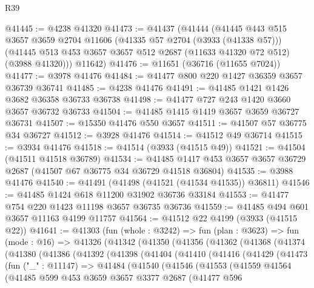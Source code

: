 \begin{lexlean}{R39}
\begin{coremodule}
@41445 := @4238 @41320
@41473 := @41437
    (@41444
      (@41445
        @443
        @515
        @3657
        @3659
        @2704
        @11606
        (@41335 @57 @2704 (@3933 (@41338 @57)))
        (@41445 @513 @453 @3657 @3657 @512 @2687 (@11633 @41320 @72 @512) (@3988 @41320)))
      @11642)
@41476 := @11651 (@36716 (@11655 @7024))
@41477 := @3978 @41476
@41484 := @41477 @800 @220 @1427 @36359 @3657 @36739 @36741
@41485 := @4238 @41476
@41491 := @41485 @1421 @1426 @3682 @36358 @36733 @36738
@41498 := @41477 @727 @243 @1420 @3660 @3657 @36732 @36733
@41504 := @41485 @1415 @1419 @3657 @3659 @36727 @36731
@41507 := @15350 @41476 @550 @3657
@41511 := @41507 @57 @36775 @34 @36727
@41512 := @3928 @41476
@41514 := @41512 @49 @36714
@41515 := @3934 @41476
@41518 := @41514 (@3933 (@41515 @49))
@41521 := @41504 (@41511 @41518 @36789)
@41534 := @41485 @1417 @453 @3657 @3657 @36729 @2687 (@41507 @67 @36775 @34 @36729 @41518 @36804)
@41535 := @3988 @41476
@41540 := @41491 (@41498 (@41521 (@41534 @41535)) @36811)
@41546 := @41485 @1424 @618 @11200 @31902 @36736 @33184
@41553 := @41477 @754 @220 @1423 @11198 @3657 @36735 @36736
@41559 := @41485 @494 @601 @3657 @11163 @4199 @11757
@41564 := @41512 @22 @4199 (@3933 (@41515 @22))
@41641 := @41303
    (fun (whole : @3242) =>
    fun (plan : @3623) =>
    fun (mode : @16) =>
    @41326
      (@41342
        (@41350
          (@41356
            (@41362
              (@41368
                (@41374
                  (@41380
                    (@41386
                      (@41392
                        (@41398
                          (@41404
                            (@41410
                              (@41416
                                (@41429
                                  (@41473
                                    (fun ("_" : @11147) =>
                                    @41484
                                      (@41540
                                        (@41546
                                          (@41553
                                            (@41559
                                              @41564
                                              (@41485
                                                @599
                                                @453
                                                @3659
                                                @3657
                                                @3377
                                                @2687
                                                (@41477
                                                  @596

\end{coremodule}
\end{lexlean}
